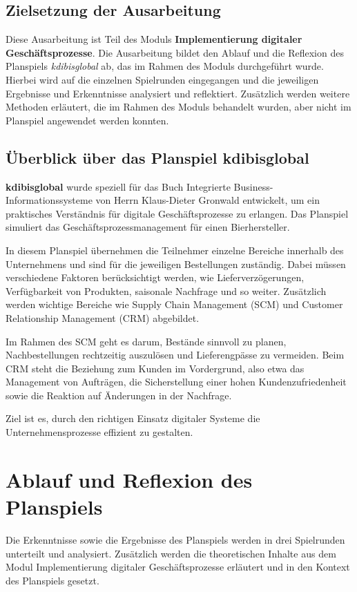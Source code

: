 \documentclass[a4paper,12pt]{article}
\begin{document}
\subsection{Zielsetzung der Ausarbeitung}
Diese Ausarbeitung ist Teil des Moduls \textbf{Implementierung digitaler Geschäftsprozesse}.
Die Ausarbeitung bildet den Ablauf und die Reflexion des Planspiels \textit{kdibisglobal} ab,
das im Rahmen des Moduls durchgeführt wurde.
Hierbei wird auf die einzelnen Spielrunden eingegangen
und die jeweiligen Ergebnisse und Erkenntnisse analysiert und reflektiert.
Zusätzlich werden weitere Methoden
erläutert, die im Rahmen des Moduls behandelt wurden, aber nicht im Planspiel angewendet werden konnten.

\subsection{Überblick über das Planspiel kdibisglobal}
\textbf{kdibisglobal} wurde speziell für das Buch Integrierte Business-Informationssysteme von Herrn Klaus-Dieter Gronwald entwickelt,
um ein praktisches Verständnis für digitale Geschäftsprozesse zu erlangen.
Das Planspiel simuliert das Geschäftsprozessmanagement für einen Bierhersteller.

In diesem Planspiel übernehmen die Teilnehmer einzelne Bereiche innerhalb des Unternehmens und sind für die jeweiligen Bestellungen zuständig.
Dabei müssen verschiedene Faktoren berücksichtigt werden, wie Lieferverzögerungen, Verfügbarkeit von Produkten, saisonale Nachfrage und so weiter.
Zusätzlich werden wichtige Bereiche wie Supply Chain Management (SCM) und Customer Relationship Management (CRM) abgebildet.

Im Rahmen des SCM geht es darum, Bestände sinnvoll zu planen, Nachbestellungen rechtzeitig auszulösen und Lieferengpässe zu vermeiden.
Beim CRM steht die Beziehung zum Kunden im Vordergrund, also etwa das Management von Aufträgen,
die Sicherstellung einer hohen Kundenzufriedenheit sowie die Reaktion auf Änderungen in der Nachfrage.

Ziel ist es, durch den richtigen Einsatz digitaler Systeme die Unternehmensprozesse effizient zu gestalten.\cite{Kdibisglobal}

\section{Ablauf und Reflexion des Planspiels}
Die Erkenntnisse sowie die Ergebnisse des Planspiels werden in drei Spielrunden unterteilt und analysiert.
Zusätzlich werden die theoretischen Inhalte aus dem Modul Implementierung digitaler Geschäftsprozesse erläutert und
in den Kontext des Planspiels gesetzt.
\end{document}

